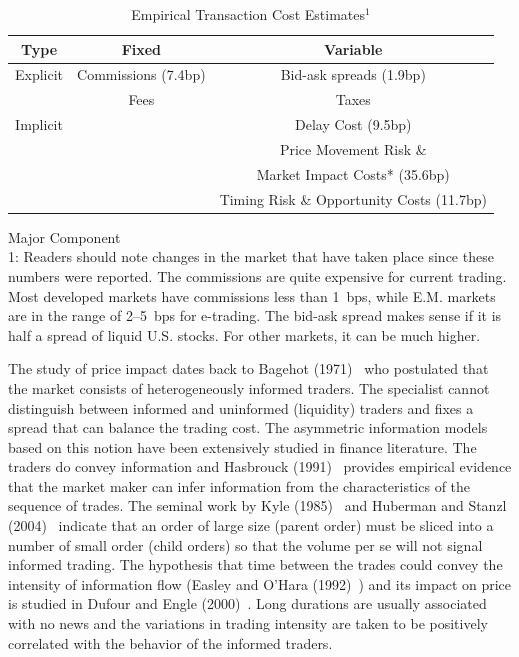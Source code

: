 	\begin{table}[!ht]
	\caption{Empirical Transaction Cost Estimates$^1$ \label{tab:empttrans}}	
	\begin{tabular}{|c|c|c|}
	Type & Fixed & Variable \\ \hline \hline
	Explicit & Commissions (7.4bp) & Bid-ask spreads (1.9bp) \\ \hline
	& Fees & Taxes \\ \hline \hline
	Implicit & & Delay Cost (9.5bp) \\ \hline
	& & Price Movement Risk \& \\
	& & Market Impact Costs* (35.6bp) \\ \hline
	& & Timing Risk \& Opportunity Costs (11.7bp) \\ \hline 
	\end{tabular}
	{\small *Major Component \\ 1: Readers should note changes in the market that have taken place since these numbers were reported. The commissions are quite expensive for current trading. Most developed markets  have commissions less than 1~bps, while E.M. markets are in the range of 2--5~bps for e-trading. The bid-ask spread makes sense if it is half a spread of liquid U.S. stocks. For other markets, it can be much higher.}
	\end{table}


The study of price impact dates back to Bagehot (1971)~\cite{bagehot} who postulated that the market consists of heterogeneously informed traders. The specialist cannot distinguish between informed and uninformed (liquidity) traders and fixes a spread that can balance the trading cost. The asymmetric information models based on this notion have been extensively studied in finance literature. The traders do convey information and Hasbrouck (1991)~\cite{hasbrouk} provides empirical evidence that the market maker can infer information from the characteristics of the sequence of trades. The seminal work by Kyle (1985)~\cite{kyle1985} and Huberman and Stanzl (2004)~\cite{huberstan} indicate that an order of large size (parent order) must be sliced into a number of small order (child orders) so that the volume per se will not signal informed trading. The hypothesis that time between the trades could convey the intensity of information flow (Easley and O'Hara (1992)~\cite{easleyo}) and its impact on price is studied in Dufour and Engle (2000)~\cite{dufour}. Long durations are usually associated with no news and the variations in trading intensity are taken to be positively correlated with the behavior of the informed traders. \twomedskip


